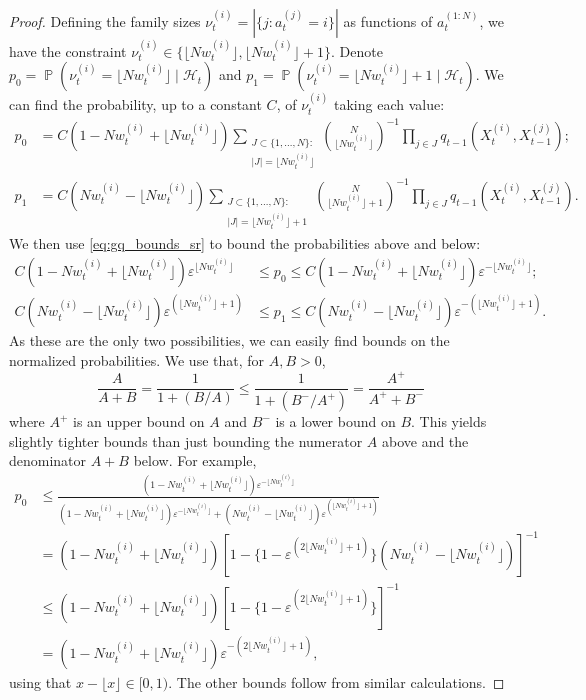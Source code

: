 \documentclass{article}
\theoremstyle{definition}
\DeclareMathOperator{\Prob}{\mathbb{P}}
\newcommand{\flnw}{\lfloor N w_t^{(i)} \rfloor}
\newcommand{\1}[1]{\mathbbm{1}_{\{#1\}}}
\begin{document}
\begin{proof}
Defining the family sizes $\nu_t^{(i)} = |\{ j : a_t^{(j)} = i \}|$ as functions of $a_t^{(1:N)}$, we have the constraint $\nu_t^{(i)} \in \{\flnw, \flnw +1\}$.  Denote $p_0=\Prob(\nu_t^{(i)} = \flnw \mid \mathcal{H}_t)$ and $p_1 = \Prob(\nu_t^{(i)} = \flnw +1 \mid \mathcal{H}_t)$. We can find the probability, up to a constant $C$, of $\nu_t^{(i)}$ taking each value:
\begin{align*}
p_0 &= C (1- N w_t^{(i)} + \flnw)\sum_{\substack{J\subset \{1,\dots,N\}:\\ |J|=\flnw}} \binom{N}{\flnw}^{-1} \prod_{j\in J} q_{t-1}(X_t^{(i)}, X_{t-1}^{(j)}) ; \\
p_1 &= C (N w_t^{(i)} - \flnw)\sum_{\substack{J\subset \{1,\dots,N\}:\\ |J|=\flnw +1}} \binom{N}{\flnw+1}^{-1} \prod_{j\in J} q_{t-1}(X_t^{(i)}, X_{t-1}^{(j)}) .
\end{align*}
We then use \eqref{eq:gq_bounds_sr} to bound the probabilities above and below:
\begin{align*}
C (1- N w_t^{(i)} + \flnw) \varepsilon^{\flnw} &\leq p_0 \leq C (1- N w_t^{(i)} + \flnw) \varepsilon^{-\flnw} ;\\
C (N w_t^{(i)} - \flnw) \varepsilon^{(\flnw +1)} &\leq p_1 \leq C (N w_t^{(i)} - \flnw) \varepsilon^{-(\flnw+1)} .
\end{align*}
As these are the only two possibilities, we can easily find bounds on the normalized probabilities. We use that, for $A,B > 0$,
\begin{equation*}
\frac{A}{A+B} = \frac{1}{1+ (B/A)} \leq \frac{1}{1+(B^-/A^+)} = \frac{A^+}{A^+ + B^-}
\end{equation*}
where $A^+$ is an upper bound on $A$ and $B^-$ is a lower bound on $B$. This yields slightly tighter bounds than just bounding the numerator $A$ above and the denominator $A+B$ below. For example,
\begin{align*}
p_0
&\leq \frac{(1-N w_t^{(i)} + \flnw)\varepsilon^{-\flnw}}{(1-N w_t^{(i)} + \flnw)\varepsilon^{-\flnw} + (N w_t^{(i)} - \flnw)\varepsilon^{(\flnw + 1)}} \\
&= (1-N w_t^{(i)} + \flnw) \left[ 1- \{ 1-\varepsilon^{(2\flnw+1)} \}(N w_t^{(i)} - \flnw) \right]^{-1} \\
&\leq (1-N w_t^{(i)} + \flnw) \left[ 1- \{ 1-\varepsilon^{(2\flnw+1)} \} \right]^{-1} \\
&= (1-N w_t^{(i)} + \flnw) \varepsilon^{-(2\flnw+1)} ,
\end{align*}
using that $x-\lfloor x \rfloor \in [0,1)$.
The other bounds follow from similar calculations.

\end{proof}
\end{document}
